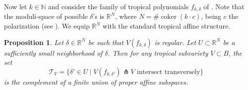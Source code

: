 \documentclass[10pt]{amsart}
\newtheorem{prop}[thm]{Proposition}
\theoremstyle{definition}
\theoremstyle{remark}
\def\N{\mathbb{N}}
\def\R{\mathbb{R}}
\DeclareMathOperator{\coker}{coker}
\begin{document}
Now let $k \in \N$ and consider the family of tropical polynomials $f_{k,\delta}$ of .
Note that the moduli-space of possible $\delta$'s is $
\R^N$, where $N = \# \coker(k\cdot c)$, being $c$ the polarization (see ).
We equip $\R^{N}$ with the standard tropical affine structure.

\begin{prop}\label{prop:neighborhood_regular}
    Let $\delta \in \R^N$ be such that $V(f_{k,\delta})$ is regular.
    Let $U \subset \R^N$ be a sufficiently small neighborhood of $\delta$.
    Then for any tropical subvariety $V \subset B$, the set
    $$
    \mathcal T_V = \{\delta' \in U \mid V(f_{k,\delta'}) \pitchfork V\text{ intersect transversely}\}
    $$
    is the complement of a finite union of proper affine subspaces.
\end{prop}
\end{document}
